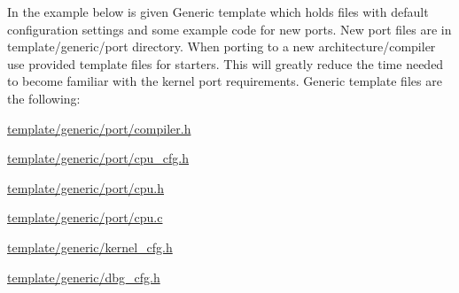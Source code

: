 In the example below is given {\ttfamily Generic} template which holds files with default configuration settings and some example code for new ports. New port files are in template/generic/port directory. When porting to a new architecture/compiler use provided template files for starters. This will greatly reduce the time needed to become familiar with the kernel port requirements. Generic template files are the following\-:
\begin{DoxyItemize}
\item {\ttfamily \hyperlink{compiler_8h}{template/generic/port/compiler.\-h}}
\item {\ttfamily \hyperlink{cpu__cfg_8h}{template/generic/port/cpu\-\_\-cfg.\-h}}
\item {\ttfamily \hyperlink{cpu_8h}{template/generic/port/cpu.\-h}}
\item {\ttfamily \hyperlink{cpu_8c}{template/generic/port/cpu.\-c}}
\item {\ttfamily \hyperlink{template_2generic_2kernel__cfg_8h}{template/generic/kernel\-\_\-cfg.\-h}}
\item {\ttfamily \hyperlink{template_2generic_2dbg__cfg_8h}{template/generic/dbg\-\_\-cfg.\-h}} 
\end{DoxyItemize}